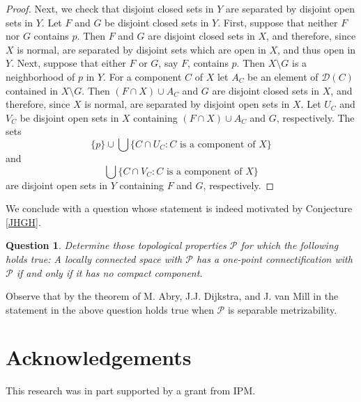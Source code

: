 \documentclass{amsart}
\newtheorem{question}[theorem]{Question}
\newenvironment{proof of claim}{\noindent\textbf{Proof of the claim.}}{\hfill{$\square$}\newline}
\theoremstyle{definition}
\theoremstyle{remark}
\numberwithin{equation}{section}
\begin{document}
\begin{proof}
Next, we check that disjoint closed sets in $Y$ are separated by disjoint open sets in $Y$. Let $F$ and $G$ be disjoint closed sets in $Y$. First, suppose that neither $F$ nor $G$ contains $p$. Then $F$ and $G$ are disjoint closed sets in $X$, and therefore, since $X$ is normal, are separated by disjoint sets which are open in $X$, and thus open in $Y$. Next, suppose that either $F$ or $G$, say $F$, contains $p$. Then $X\setminus G$ is a neighborhood of $p$ in $Y$. For a component $C$ of $X$ let $A_C$ be an element of $\mathscr{D}(C)$ contained in $X\setminus G$. Then $(F\cap X)\cup A_C$ and $G$ are disjoint closed sets in $X$, and therefore, since $X$ is normal, are separated by disjoint open sets in $X$. Let $U_C$ and $V_C$ be disjoint open sets in $X$ containing $(F\cap X)\cup A_C$ and $G$, respectively. The sets
\[\{p\}\cup\bigcup\{C\cap U_C:\mbox{$C$ is a component of $X$}\}\]
and
\[\bigcup\{C\cap V_C:\mbox{$C$ is a component of $X$}\}\]
are disjoint open sets in $Y$ containing $F$ and $G$, respectively.
\end{proof}

We conclude with a question whose statement is indeed motivated by Conjecture \ref{JHGH}.

\begin{question}\label{HGF}
Determine those topological properties $\mathscr{P}$ for which the following holds true: A locally connected space with $\mathscr{P}$ has a one-point connectification with $\mathscr{P}$ if and only if it has no compact component.
\end{question}

Observe that by the theorem of M. Abry, J.J. Dijkstra, and J. van Mill in \cite{ADvM} the statement in the above question holds true when $\mathscr{P}$ is separable metrizability.

\section*{Acknowledgements}

This research was in part supported by a grant from IPM.

\end{document}
